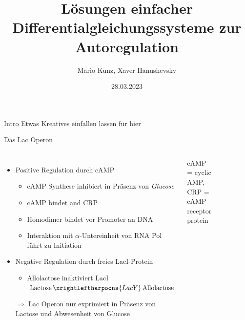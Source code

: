 \documentclass[11pt,aspectratio=169,reqno]{beamer}
\title{Lösungen einfacher Differentialgleichungssysteme zur Autoregulation}
\date[28.03.2023]{28.03.2023}
\author{Mario Kunz, Xaver Hanushevsky}
\institute{D-BIOL}
\begin{document}
\setlength{\titleboxwidth}{0.65\textwidth}
\titleframe

\begin{frame}[fragile]{Intro}
    Etwas Kreatives einfallen lassen für hier
\end{frame}

\begin{frame}{Das Lac Operon}
\begin{columns}

    \begin{itemize}
        \item Positive Regulation durch cAMP\\
        \begin{itemize}
            \item cAMP Synthese inhibiert in Präsenz von \emph{Glucose}
            \item cAMP bindet and CRP
            \item Homodimer bindet vor Promoter an DNA
            \item Interaktion mit $\alpha$-Untereinheit von RNA Pol führt zu Initiation
        \end{itemize}
        \item Negative Regulation durch freies LacI-Protein
        \begin{itemize}
            \item Allolactose inaktiviert LacI \\ $\ce{Lactose $\xrightleftharpoons{LacY}$ Allolactose}$
        \end{itemize}
        \item[$\Rightarrow$] Lac Operon nur exprimiert in Präsenz von Lactose und Abwesenheit von Glucose
    \end{itemize}

    {\tiny cAMP = cyclic AMP, CRP = cAMP receptor protein}
    
    \begin{figure}
        \centering
        \includegraphics[width=\textwidth]{images/lac_operon.png}
    \end{figure}
\end{columns}
\end{frame}
\end{document}
